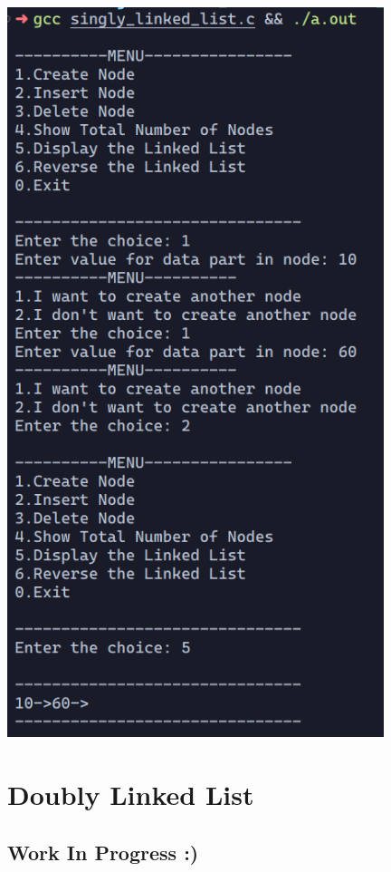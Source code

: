 \documentclass{report}
\begin{document}
\includegraphics[width=110mm,scale=0.5]{../Linked_List/outputs/sll.png}

\chapter{Doubly Linked List}
\section{Work In Progress :)} 
\end{document}

